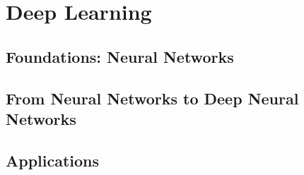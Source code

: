 \chapter{Deep Learning}\label{chapter:deeplearning}

\section{Foundations: Neural Networks}
\section{From Neural Networks to Deep Neural Networks}
\section{Applications}